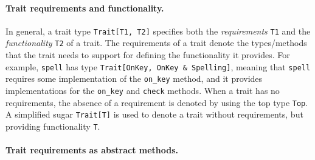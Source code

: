 \paragraph{Trait requirements and functionality.}

In general, a trait type
\lstinline{Trait[T1, T2]} specifies both the \emph{requirements} \lstinline{T1}
and the \emph{functionality} \lstinline{T2} of a trait. The requirements of a trait denote the types/methods that the
trait needs to support for defining the functionality it provides. %
For example, \lstinline{spell} has type
\lstinline{Trait[OnKey, OnKey & Spelling]}, meaning that \lstinline{spell}
requires some implementation of the \lstinline{on_key} method, and it provides
implementations for the \lstinline{on_key} and \lstinline{check} methods.
When a trait
has no requirements, the absence of a requirement is denoted by using
the top type \lstinline{Top}. A simplified sugar \lstinline{Trait[T]} is
used to denote a trait without requirements, but providing functionality \lstinline{T}.




\paragraph{Trait requirements as abstract methods.}

